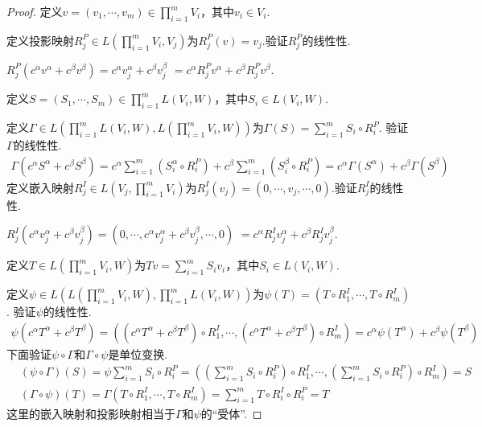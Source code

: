\begin{proof}
    定义\(v=(v_1,\cdots,v_m) \in \prod_{i=1}^m V_i\)，其中\(v_i \in V_i\).

    定义投影映射\(R_j^P \in L(\prod_{i=1}^m V_i,V_j)\)为\(R_j^P(v)=v_j\).验证\(R_j^P\)的线性性.
    
    \(R_j^P(c^\alpha v^\alpha+c^\beta v^\beta)=c^\alpha v_j^\alpha+c^\beta v_j^\beta\)
    \(=c^\alpha R_j^P v^\alpha+c^\beta R_j^P v^\beta\).
    
    定义\(S=(S_1,\cdots,S_m) \in \prod_{i=1}^m L(V_i,W)\)，其中\(S_i \in L(V_i,W)\).
    
    定义\(\Gamma \in L(\prod_{i=1}^m L(V_i,W),L(\prod_{i=1}^m V_i,W))\)为\(\Gamma(S)=\sum_{i=1}^m S_i \circ R_i^P\).
    验证\(\Gamma\)的线性性.
    \begin{align*}
        \Gamma(c^\alpha S^\alpha+c^\beta S^\beta)
        =c^\alpha \sum_{i=1}^m(S_i^\alpha \circ R_i^P)+c^\beta \sum_{i=1}^m(S_i^\beta \circ R_i^P)
        =c^\alpha \Gamma(S^\alpha)+c^\beta \Gamma(S^\beta)
    \end{align*}
    定义嵌入映射\(R_j^I \in L(V_j,\prod_{i=1}^m V_i)\)为\(R_j^I(v_j)=(0,\cdots,v_j,\cdots,0)\).验证\(R_j^I\)的线性性.
    
    \(R_j^I(c^\alpha v_j^\alpha+c^\beta v_j^\beta)=(0,\cdots,c^\alpha v_j^\alpha+c^\beta v_j^\beta,\cdots,0)\)
    \(=c^\alpha R_j^I v_j^\alpha+c^\beta R_j^I v_j^\beta\).
    
    定义\(T \in L(\prod_{i=1}^m V_i,W)\)为\(Tv=\sum_{i=1}^m S_iv_i\)，其中\(S_i \in L(V_i,W)\).
    
    定义\(\psi \in L(L(\prod_{i=1}^m V_i,W),\prod_{i=1}^m L(V_i,W))\)为\(\psi(T)=(T \circ R_1^I,\cdots,T \circ R_m^I)\).
    验证\(\psi\)的线性性.
    \begin{align*}
        \psi(c^\alpha T^\alpha+c^\beta T^\beta)
        =((c^\alpha T^\alpha+c^\beta T^\beta) \circ R_1^I,\cdots,(c^\alpha T^\alpha+c^\beta T^\beta) \circ R_m^I)
        =c^\alpha \psi(T^\alpha)+c^\beta \psi(T^\beta)
    \end{align*}
    下面验证\(\psi \circ \Gamma\)和\(\Gamma \circ \psi\)是单位变换.
    \begin{align*}
        &(\psi \circ \Gamma)(S)=\psi \sum_{i=1}^m S_i \circ R_i^P
        =((\sum_{i=1}^m S_i \circ R_i^P) \circ R_1^I,\cdots,(\sum_{i=1}^m S_i \circ R_i^P) \circ R_m^I)=S \\
        &(\Gamma \circ \psi)(T)=\Gamma(T \circ R_1^I,\cdots,T \circ R_m^I)
        =\sum_{i=1}^m T \circ R_i^I \circ R_i^P=T
    \end{align*}
    {\kaishu 这里的嵌入映射和投影映射相当于\(\Gamma\)和\(\psi\)的“受体”.}
\end{proof}


